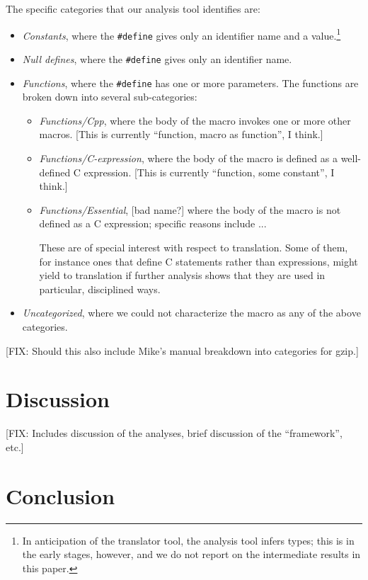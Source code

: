 The specific categories that our analysis tool identifies are:
\begin{itemize}

\item {\em Constants\/}, where the \verb+#define+ gives only an
identifier name and a value.\footnote{In anticipation of the
translator tool, the analysis tool infers types; this is in the early
stages, however, and we do not report on the intermediate results in
this paper.}  

\item {\em Null defines\/}, where the \verb+#define+ gives only an
identifier name.

\item {\em Functions\/}, where the \verb+#define+ has one or more
parameters.  The functions are broken down into several sub-categories:
\begin{itemize}

\item {\em Functions/Cpp\/}, where the body of the macro invokes one
or more other macros.  [This is currently ``function, macro as
function'', I think.]

\item {\em Functions/C-expression\/}, where the body of the macro is
defined as a well-defined C expression.  [This is currently
``function, some constant'', I think.]

\item {\em Functions/Essential\/}, [bad name?] where the body of the
macro is not defined as a C expression; specific reasons include
...

These are of special interest with respect to translation.  Some of
them, for instance ones that define C statements rather than
expressions, might yield to translation if further analysis shows that
they are used in particular, disciplined ways.

\end{itemize}

\item {\em Uncategorized\/}, where we could not characterize the macro
as any of the above categories.

\end{itemize}

[FIX: Should this also include Mike's manual breakdown into categories
for gzip.]

\section{Discussion}\label{sec:discussion}

[FIX: Includes discussion of the analyses, brief discussion of the
``framework'', etc.]

\section{Conclusion}\label{sec:conclusion}

\small 




